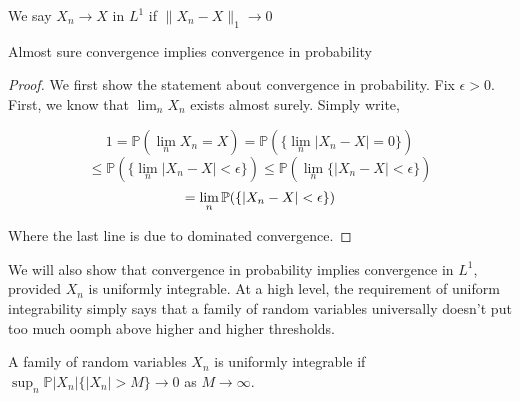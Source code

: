     \begin{definition}[Convergence in $L^1$]
        We say $X_n \to X$ in $L^1$ if $\|X_n - X\|_1 \to 0$
    \end{definition}

    \begin{Proposition} 
        Almost sure convergence implies convergence in probability
    \end{Proposition}

    \begin{proof}
        We first show the statement about convergence in probability. Fix $\epsilon > 0$. 
        First, we know that $\lim_n X_n$ exists almost surely. Simply write,

        \[ 1 = \mathbb P(\lim_n X_n = X) = \mathbb P(\{\lim_n |X_n - X| = 0\}) \]
        \[ \leq \mathbb P(\{\lim_n |X_n - X| < \epsilon \}) \leq \mathbb P(\lim_n\{ |X_n - X| < \epsilon \}) \]
        \[ = \lim_n \mathbb P(\{|X_n - X| < \epsilon\}) \]

        Where the last line is due to dominated convergence.
    \end{proof}

    We will also show that convergence in probability implies convergence in $L^1$, provided 
    $X_n$ is uniformly integrable. At a high level, the requirement of uniform integrability 
    simply says that a family of random variables universally doesn't put too much oomph above 
    higher and higher thresholds.

    \begin{definition}
        A family of random variables $X_n$ is uniformly integrable if 
        $\sup_n \mathbb P|X_n|\{|X_n| > M\} \to 0$ as $M \to \infty$. 
    \end{definition}


